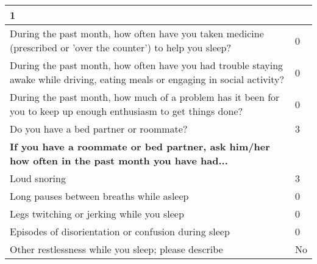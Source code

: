\begin{table}[H]
\begin{tabularx}{\textwidth}{|X|l|}
        1 
        \\ \hline
        During the past month, how often have you taken medicine (prescribed or 'over the counter') to help you sleep? & 
        0  
        \\ \hline
        During the past month, how often have you had trouble staying awake while driving, eating meals or engaging in social activity? & 
        0 
        \\ \hline
        During the past month, how much of a problem has it been for you to keep up enough enthusiasm to get things done? & 
        0 
        \\ \hline
        Do you have a bed partner or roommate? & 
        3 
        \\ \hline
        \textbf{If you have a roommate or bed partner, ask him/her how often in the past month you have had...} & \\ \hline
        \quad Loud snoring & 
        3 
        \\ \hline
        \quad Long pauses between breaths while asleep &  
        0 
        \\ \hline
        \quad Legs twitching or jerking while you sleep & 
        0 
        \\ \hline
        \quad Episodes of disorientation or confusion during sleep & 
        0 
        \\ \hline
        \quad Other restlessness while you sleep; please describe & 
        No  
        \\ \hline
    \end{tabularx}
\end{table}

